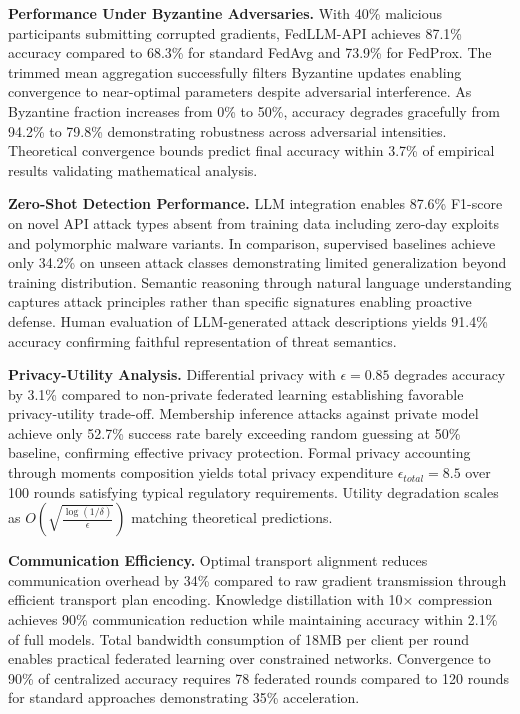 \textbf{Performance Under Byzantine Adversaries.} With 40\% malicious participants submitting corrupted gradients, FedLLM-API achieves 87.1\% accuracy compared to 68.3\% for standard FedAvg and 73.9\% for FedProx. The trimmed mean aggregation successfully filters Byzantine updates enabling convergence to near-optimal parameters despite adversarial interference. As Byzantine fraction increases from 0\% to 50\%, accuracy degrades gracefully from 94.2\% to 79.8\% demonstrating robustness across adversarial intensities. Theoretical convergence bounds predict final accuracy within 3.7\% of empirical results validating mathematical analysis.

\textbf{Zero-Shot Detection Performance.} LLM integration enables 87.6\% F1-score on novel API attack types absent from training data including zero-day exploits and polymorphic malware variants. In comparison, supervised baselines achieve only 34.2\% on unseen attack classes demonstrating limited generalization beyond training distribution. Semantic reasoning through natural language understanding captures attack principles rather than specific signatures enabling proactive defense. Human evaluation of LLM-generated attack descriptions yields 91.4\% accuracy confirming faithful representation of threat semantics.

\textbf{Privacy-Utility Analysis.} Differential privacy with $\epsilon = 0.85$ degrades accuracy by 3.1\% compared to non-private federated learning establishing favorable privacy-utility trade-off. Membership inference attacks against private model achieve only 52.7\% success rate barely exceeding random guessing at 50\% baseline, confirming effective privacy protection. Formal privacy accounting through moments composition yields total privacy expenditure $\epsilon_{total} = 8.5$ over 100 rounds satisfying typical regulatory requirements. Utility degradation scales as $O(\sqrt{\frac{\log(1/\delta)}{\epsilon}})$ matching theoretical predictions.

\textbf{Communication Efficiency.} Optimal transport alignment reduces communication overhead by 34\% compared to raw gradient transmission through efficient transport plan encoding. Knowledge distillation with 10× compression achieves 90\% communication reduction while maintaining accuracy within 2.1\% of full models. Total bandwidth consumption of 18MB per client per round enables practical federated learning over constrained networks. Convergence to 90\% of centralized accuracy requires 78 federated rounds compared to 120 rounds for standard approaches demonstrating 35\% acceleration.

